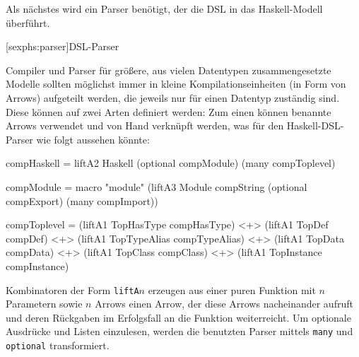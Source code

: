 \documentclass[12pt, a4paper, bibgerm]{scrbook}
\newenvironment{DIFnomarkup}{}{}
\newcommand\icode[1]{\lstinline?#1?}
\newcommand\lsection{}
\begin{document}
Als nächstes wird ein Parser benötigt, der die DSL in das
Haskell-Modell überführt.

\lsection[sexphs:parser]{DSL-Parser}

Compiler und Parser für größere, aus vielen Datentypen zusammengesetzte
Modelle sollten möglichst immer in kleine Kompilationseinheiten (in Form
von Arrows) aufgeteilt werden, die jeweils nur für einen Datentyp
zuständig sind. Diese können auf zwei Arten definiert werden: Zum einen
können benannte Arrows verwendet und von Hand verknüpft werden, was für
den Haskell-DSL-Parser wie folgt aussehen könnte:
\begin{DIFnomarkup}\begin{code}
compHaskell = liftA2 Haskell (optional compModule) (many compToplevel)

compModule = macro "module" (liftA3 Module
                                    compString
                                    (optional compExport)
                                    (many compImport))

compToplevel = (liftA1 TopHasType   compHasType)   <+>
               (liftA1 TopDef       compDef)       <+>
               (liftA1 TopTypeAlias compTypeAlias) <+>
               (liftA1 TopData      compData)      <+>
               (liftA1 TopClass     compClass)     <+>
               (liftA1 TopInstance  compInstance)
\end{code}\end{DIFnomarkup}
Kombinatoren der Form \icode{liftA}$n$ erzeugen aus einer puren Funktion mit
$n$ Parametern sowie $n$ Arrows einen Arrow, der diese Arrows
nacheinander aufruft und deren Rückgaben im Erfolgsfall an die Funktion
weiterreicht. Um optionale Ausdrücke und Listen einzulesen, werden die
benutzten Parser mittels \icode{many} und \icode{optional}
transformiert.
\end{document}
